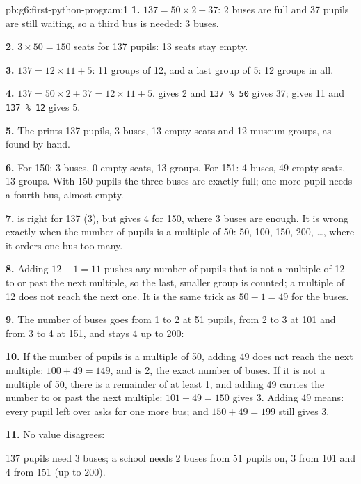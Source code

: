 \begin{solution}{pb:g6:first-python-program:1}
\textbf{1.} $137 = 50 \times 2 + 37$: 2 buses are full and 37 pupils are still
waiting, so a third bus is needed: 3 buses.

\textbf{2.} $3 \times 50 = 150$ seats for 137 pupils: 13 seats stay empty.

\textbf{3.} $137 = 12 \times 11 + 5$: 11 groups of 12, and a last group of 5:
12 groups in all.

\textbf{4.} $137 = 50 \times 2 + 37 = 12 \times 11 + 5$.  gives 2
and \texttt{137 \% 50} gives 37;  gives 11 and \texttt{137 \% 12}
gives 5.

\textbf{5.} The  prints 137 pupils, 3 buses, 13 empty seats and 12
museum groups, as found by hand.

\label{out:g6:first-python-program:trip}

\textbf{6.} For 150: 3 buses, 0 empty seats, 13 groups. For 151: 4 buses, 49
empty seats, 13 groups. With 150 pupils the three buses are exactly full; one
more pupil needs a fourth bus, almost empty.

\textbf{7.}  is right for 137 (3), but gives 4 for 150,
where 3 buses are enough. It is wrong exactly when the number of pupils is a
multiple of 50: 50, 100, 150, 200, \dots, where it orders one bus too many.

\textbf{8.} Adding $12 - 1 = 11$ pushes any number of pupils that is not a
multiple of 12 to or past the next multiple, so the last, smaller group is
counted; a multiple of 12 does not reach the next one. It is the same trick as
$50 - 1 = 49$ for the buses.

\textbf{9.} The number of buses goes from 1 to 2 at 51 pupils, from 2 to 3 at
101 and from 3 to 4 at 151, and stays 4 up to 200:

\label{out:g6:first-python-program:buses-table}

\textbf{10.} If the number of pupils is a multiple of 50, adding 49 does not
reach the next multiple: $100 + 49 = 149$, and  is 2, the exact
number of buses. If it is not a multiple of 50, there is a remainder of at least
1, and adding 49 carries the number to or past the next multiple: $101 + 49 = 150$
gives 3. Adding 49 means: every pupil left over asks for one more bus; and
$150 + 49 = 199$ still gives 3.

\textbf{11.} No value disagrees:

\label{out:g6:first-python-program:buses-check}

137 pupils need 3 buses; a school needs 2 buses from 51 pupils on, 3 from 101
and 4 from 151 (up to 200).
\end{solution}
